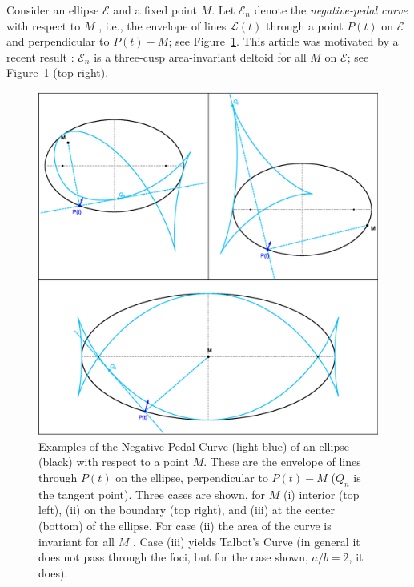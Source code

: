 Consider an ellipse $\mathcal{E}$ and a fixed point $M$. Let $\mathcal{E}_n$ denote the {\em negative-pedal curve} with respect to $M$ \cite{stachel2019-conics}, i.e., the envelope of lines $\mathcal{L}(t)$ through a point $P(t)$ on $\mathcal{E}$ and perpendicular to $P(t)-M$; see Figure~\ref{fig:npc-3}. This article was motivated by a recent result  \cite{garcia2020-deltoid}: $\mathcal{E}_n$ is a three-cusp area-invariant deltoid for all $M$ on $\mathcal{E}$; see Figure~\ref{fig:npc-3} (top right).

\begin{figure}
    \centering
    \includegraphics[width=\textwidth]{pics/0005_npc_3.eps}
    \caption{Examples of the Negative-Pedal Curve (light blue) of an ellipse (black) with respect to a point $M$. These are the envelope of lines through $P(t)$ on the ellipse, perpendicular to $P(t)-M$ ($Q_n$ is the tangent point). Three cases are shown, for $M$ (i) interior (top left), (ii) on the boundary (top right), and (iii) at the center (bottom) of the ellipse. For case (ii) the area of the curve is invariant for all $M$ \cite{garcia2020-deltoid}. Case (iii) yields Talbot's Curve \cite{mw} (in general it does not pass through the foci, but for the case shown, $a/b=2$, it does).} 
    \label{fig:npc-3}
\end{figure}

